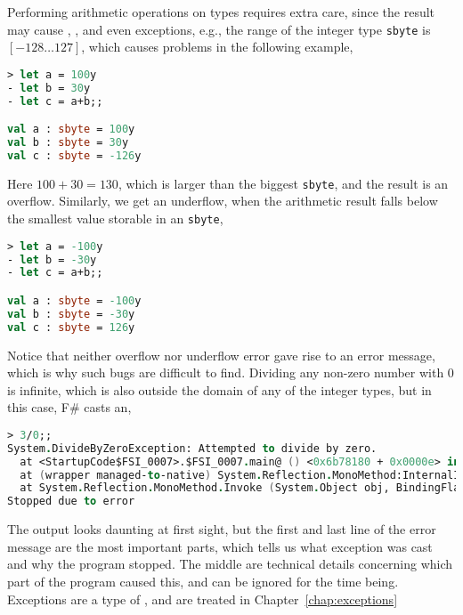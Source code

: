 Performing arithmetic operations on  types requires extra care, since the result may cause , , and even exceptions, e.g., the range of the integer type \lstinline|sbyte| is $[-128\ldots 127]$, which causes problems in the following example,
%
\begin{lstlisting}[language=fsharp,caption={fsharpi, adding integers may cause overflow.},label=overflow]
> let a = 100y 
- let b = 30y 
- let c = a+b;;

val a : sbyte = 100y
val b : sbyte = 30y
val c : sbyte = -126y
\end{lstlisting}
Here $100+30=130$, which is larger than the biggest \lstinline|sbyte|, and the result is an overflow. Similarly, we get an underflow, when the arithmetic result falls below the smallest value storable in an \lstinline|sbyte|,
%
\begin{lstlisting}[language=fsharp,caption={fsharpi, subtracting integers may cause underflow}]
> let a = -100y  
- let b = -30y  
- let c = a+b;;

val a : sbyte = -100y
val b : sbyte = -30y
val c : sbyte = 126y
\end{lstlisting}
Notice that neither overflow nor underflow error gave rise to an error message, which is why such bugs are difficult to find. 
 Dividing any non-zero number with 0 is infinite, which is also outside the domain of any of the integer types, but in this case, F\# casts an,
%
\begin{lstlisting}[language=fsharp,caption={fsharpi, integer division by zero causes an exception run-time error.}]
> 3/0;; 
System.DivideByZeroException: Attempted to divide by zero.
  at <StartupCode$FSI_0007>.$FSI_0007.main@ () <0x6b78180 + 0x0000e> in <filename unknown>:0 
  at (wrapper managed-to-native) System.Reflection.MonoMethod:InternalInvoke (System.Reflection.MonoMethod,object,object[],System.Exception&)
  at System.Reflection.MonoMethod.Invoke (System.Object obj, BindingFlags invokeAttr, System.Reflection.Binder binder, System.Object[] parameters, System.Globalization.CultureInfo culture) <0x1a55ba0 + 0x000a1> in <filename unknown>:0 
Stopped due to error
\end{lstlisting}
The output looks daunting at first sight, but the first and last line of the error message are the most important parts, which tells us what exception was cast and why the program stopped. The middle are technical details concerning which part of the program caused this, and can be ignored for the time being. Exceptions are a type of , and are treated in Chapter~\ref{chap:exceptions}

